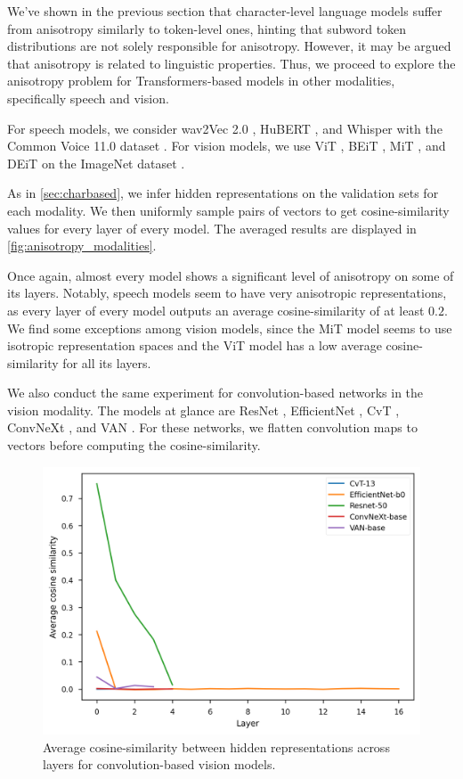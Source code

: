 We've shown in the previous section that character-level language models suffer from anisotropy similarly to token-level ones, hinting that subword token distributions are not solely responsible for anisotropy. However, it may be argued that anisotropy is related to linguistic properties. Thus, we proceed to explore the anisotropy problem for Transformers-based models in other modalities, specifically speech and vision.

For speech models, we consider wav2Vec 2.0 \citep{wav2vec}, HuBERT \citep{HuBERT}, and Whisper \citep{radford2022whisper} with the Common Voice 11.0 dataset \citep{commonvoice:2020}. For vision models, we use ViT \citep{Wu2020VisualTT}, BEiT \citep{beit-2021}, MiT \citep{segformer21}, and DEiT \citep{pmlr-v139-touvron21a} on the ImageNet dataset \citep{imagenet15russakovsky}.

As in \autoref{sec:charbased}, we infer hidden representations on the validation sets for each modality. We then uniformly sample pairs of vectors to get cosine-similarity values for every layer of every model. The averaged results are displayed in \autoref{fig:anisotropy_modalities}.

Once again, almost every model shows a significant level of anisotropy on some of its layers. Notably, speech models seem to have very anisotropic representations, as every layer of every model outputs an average cosine-similarity of at least $0.2$. We find some exceptions among vision models, since the MiT model seems to use isotropic representation spaces and the ViT model has a low average cosine-similarity for all its layers.

We also conduct the same experiment for convolution-based networks in the vision modality. The models at glance are ResNet \citep{he2016deep}, EfficientNet \citep{Tan2019EfficientNetRM}, CvT \citep{wu2021cvt}, ConvNeXt \citep{liu2022convnet}, and VAN \citep{guo2022visual}. For these networks, we flatten convolution maps to vectors before computing the cosine-similarity.

\begin{figure}[ht]
    \centering
    \includegraphics[width=\linewidth]{sources/part_1/anisotropy/imgs/cosine_cnn_imagenet.png}
    \caption{Average cosine-similarity between hidden representations across layers for convolution-based vision models.}
    \label{fig:convbased}
\end{figure}

